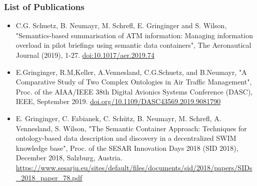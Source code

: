 \documentclass[a4paper,11pt]{article}
\begin{document}
\subsubsection*{List of Publications}

\begin{itemize}
\item C.G. Schuetz, B. Neumayr, M. Schrefl, E. Gringinger and S. Wilson, "Semantics-based summarisation of ATM information: Managing information overload in pilot briefings using semantic data containers", The Aeronautical Journal (2019), 1-27. \url{doi:10.1017/aer.2019.74}
\item E.Gringinger, R.M,Keller, A.Vennesland, C.G.Schuetz, and B.Neumayr, "A Comparative Study of Two Complex Ontologies in Air Traffic Management", Proc. of the AIAA/IEEE 38th Digital Avionics Systems Conference (DASC), IEEE, September 2019. \url{doi.org/10.1109/DASC43569.2019.9081790}
\item E. Gringinger, C. Fabianek, C. Schütz, B. Neumayr, M. Schrefl, A. Vennesland, S. Wilson, "The Semantic Container Approach: Techniques for ontology-based data description and discovery in a decentralized SWIM knowledge base", Proc. of the SESAR Innovation Days 2018 (SID 2018), December 2018, Salzburg, Austria. \url{https://www.sesarju.eu/sites/default/files/documents/sid/2018/papers/SIDs\_2018\_paper\_78.pdf}
\end{itemize}
\end{document}
